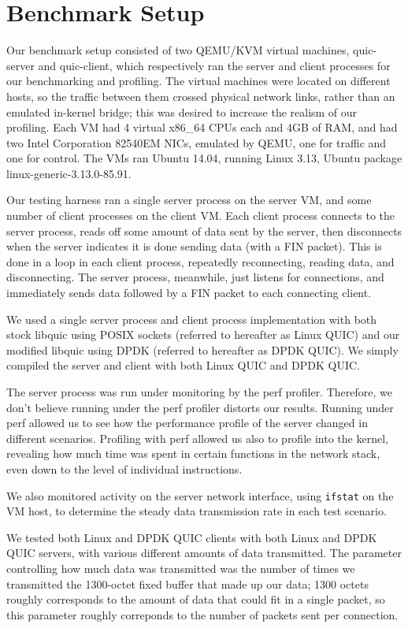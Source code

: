 \documentclass{sig-alternate-05-2015}
\begin{document}
\section{Benchmark Setup}
Our benchmark setup consisted of two QEMU/KVM virtual machines,
quic-server and quic-client,
which respectively ran the server and client processes for our benchmarking and profiling.
The virtual machines were located on different hosts,
so the traffic between them crossed physical network links, rather than an emulated in-kernel bridge;
this was desired to increase the realism of our profiling.
Each VM had 4 virtual x86\_64 CPUs each and 4GB of RAM,
and had two Intel Corporation 82540EM NICs, emulated by QEMU,
one for traffic and one for control.
The VMs ran Ubuntu 14.04,
running Linux 3.13,
Ubuntu package linux-generic-3.13.0-85.91.

Our testing harness ran a single server process on the server VM,
and some number of client processes on the client VM.
Each client process connects to the server process,
reads off some amount of data sent by the server,
then disconnects when the server indicates it is done sending data (with a FIN packet).
This is done in a loop in each client process, repeatedly reconnecting, reading data, and disconnecting.
The server process, meanwhile, just listens for connections, and immediately sends data followed by a FIN packet to each connecting client.

We used a single server process and client process implementation with both 
stock libquic using POSIX sockets
(referred to hereafter as Linux QUIC)
and our modified libquic using DPDK
(referred to hereafter as DPDK QUIC).
We simply compiled the server and client with both Linux QUIC and DPDK QUIC.

The server process was run under monitoring by the perf profiler.
Therefore, we don't believe running under the perf profiler distorts our results.
Running under perf allowed us to see how the performance profile of the server changed in different scenarios.
Profiling with perf allowed us also to profile into the kernel,
revealing how much time was spent in certain functions in the network stack,
even down to the level of individual instructions.

We also monitored activity on the server network interface,
using \texttt{ifstat} on the VM host,
to determine the steady data transmission rate in each test scenario.

We tested both Linux and DPDK QUIC clients with both Linux and DPDK QUIC servers,
with various different amounts of data transmitted.
The parameter controlling how much data was transmitted was the number of times we transmitted the 1300-octet fixed buffer that made up our data;
1300 octets roughly corresponds to the amount of data that could fit in a single packet,
so this parameter roughly correponds to the number of packets sent per connection.
\end{document}

